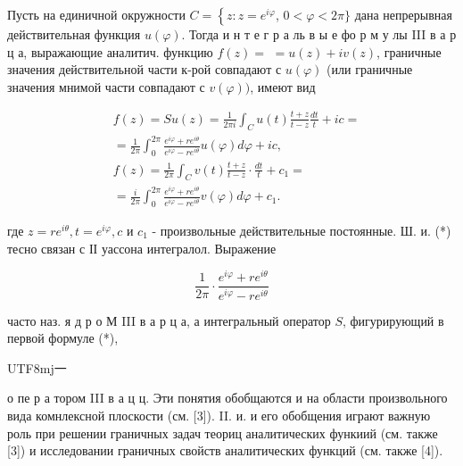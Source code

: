 \documentclass[10pt]{article}
\begin{document}
Пусть на единичной окружности $C=\left\{z: z=e^{i \varphi}\right.$, $0<\varphi<2 \pi\}$ дана непрерывная действительная функция $u(\varphi)$. Тогда и н т е г р а ль в ы е фо р м у лы III в а р ц а, выражающие аналитич. функцию $f(z)=$ $=u(z)+i v(z)$, граничные значения действительной части к-рой совпадают с $u(\varphi)$ (или граничные значения мнимой части совпадают с $v(\varphi))$, имеют вид



\[

\begin{aligned}

& f(z)=S u(z)=\frac{1}{2 \pi i} \int_{C} u(t) \frac{t+z}{t-z} \frac{d t}{t}+i c= \\

&=\frac{1}{2 \pi} \int_{0}^{2 \pi} \frac{e^{i \varphi}+r e^{i \theta}}{e^{i \varphi}-r e^{i \theta}} u(\varphi) d \varphi+i c, \\

& f(z)=\frac{1}{2 \pi} \int_{C} v(t) \frac{t+z}{t-z} \cdot \frac{d t}{t}+c_{1}= \\

&=\frac{i}{2 \pi} \int_{0}^{2 \pi} \frac{e^{i \varphi}+r e^{i \theta}}{e^{i \varphi}-r e^{i \theta}} v(\varphi) d \varphi+c_{1} .

\end{aligned}

\]



где $z=r e^{i \theta}, t=e^{i \varphi}, c$ и $c_{1}$ - произвольные действительные постоянные. Ш. и. (*) тесно связан с ІІ уассона интегралол. Выражение



\[

\frac{1}{2 \pi} \cdot \frac{e^{i \varphi}+r e^{i \theta}}{e^{i \varphi}-r e^{i \theta}}

\]



часто наз. я д р о М III в а р ц а, а интегральный оператор $S$, фигурирующий в первой формуле (*), \begin{CJK}{UTF8}{mj}一\end{CJK} о пе р а тором III в а ц ц. Эти понятия обобщаются и на области произвольного вида комнлексной плоскости (см. [3]). II. и. и его обобщения играют важную роль при решении граничных задач теориц аналитических функиий (см. также [3]) и исследовании граничных свойств аналитических функций (см. также [4]).
\end{document}
